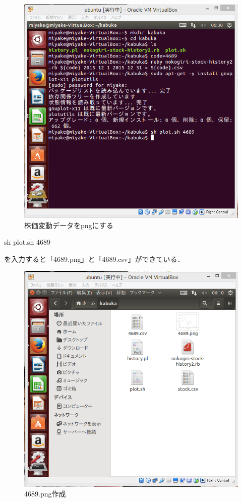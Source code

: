 {\begin{figure}[H]
\centering
\includegraphics[width=15cm]{plot.PNG}
\caption{株価変動データをpngにする}\label{サンプル図}
\end{figure}

sh plot.sh 4689

を入力すると「4689.png」と「4689.csv」ができている．



\begin{figure}[H]
\centering
\includegraphics[width=15cm]{4689.PNG}
\caption{4689.png作成}\label{サンプル図}
\end{figure}

}
